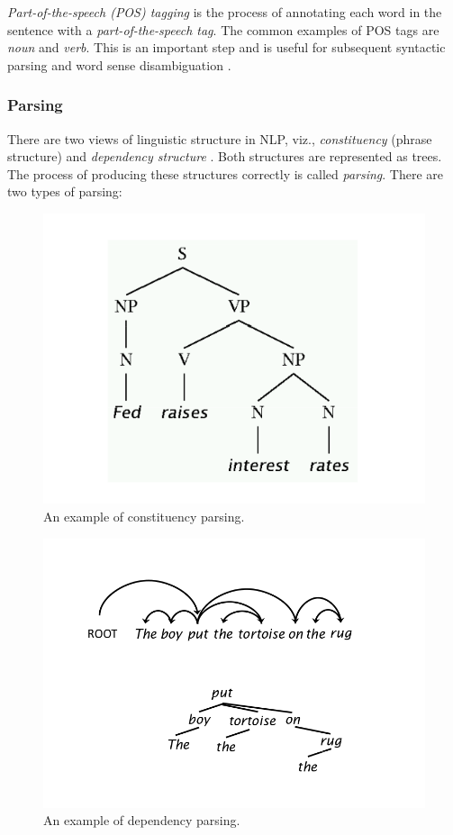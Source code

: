 \textit{Part-of-the-speech (POS) tagging} is the process of annotating each word in the sentence with a \textit{part-of-the-speech tag}. The common examples of POS tags are \textit{noun} and \textit{verb}. This is an important step and is useful for subsequent syntactic parsing and word sense disambiguation \cite{nlpcourse}. 

\subsubsection{Parsing}

There are two views of linguistic structure in NLP, viz., \textit{constituency} (phrase structure) and \textit{dependency structure} \cite{parsing}. Both structures are represented as trees. The process of producing these structures correctly is called \textit{parsing}. There are two types of parsing:

\begin{figure}
\centering
\includegraphics[scale=0.5]{figures/SyntacticParse.png}
\caption{An example of constituency parsing.}\label{fig:SynParse}
\end{figure}

\begin{figure}
\centering
\includegraphics[scale=0.4]{figures/DependencyParse.png}
\caption{An example of dependency parsing.}\label{fig:DepParse}
\end{figure}


